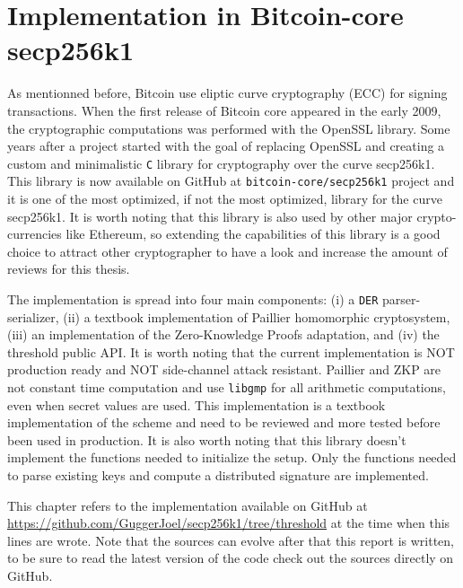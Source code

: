 \chapter{Implementation in Bitcoin-core secp256k1}
\label{chap:implementation-secp256k1}

As mentionned before, Bitcoin use eliptic curve cryptography (ECC) for signing transactions.
When the first release of Bitcoin core appeared in the early 2009, the cryptographic
computations was performed with the OpenSSL library. Some years after a project
started with the goal of replacing OpenSSL and creating a custom and minimalistic
\texttt{C} library for cryptography over the curve secp256k1. This library is now available
on GitHub at \texttt{bitcoin-core/secp256k1} project and it is one of the most optimized,
if not the most optimized, library for the curve secp256k1. It is worth noting that
this library is also used by other major crypto-currencies like Ethereum, so extending
the capabilities of this library is a good choice to attract other cryptographer
to have a look and increase the amount of reviews for this thesis.

The implementation is spread into four main components: (i) a \texttt{DER} parser-serializer,
(ii) a textbook implementation of Paillier homomorphic cryptosystem, (iii) an
implementation of the Zero-Knowledge Proofs adaptation, and (iv) the threshold
public API. It is worth noting that the current implementation is NOT production
ready and NOT side-channel attack resistant. Paillier and ZKP are not constant
time computation and use \texttt{libgmp} for all arithmetic computations, even
when secret values are used. This implementation is a textbook implementation
of the scheme and need to be reviewed and more tested before been used in production.
It is also worth noting that this library doesn't implement the functions needed
to initialize the setup. Only the functions needed to parse existing keys and compute a
distributed signature are implemented.

This chapter refers to the implementation available on GitHub at
\url{https://github.com/GuggerJoel/secp256k1/tree/threshold} at the time when
this lines are wrote. Note that the sources can evolve after that this report is written,
to be sure to read the latest version of the code check out the sources directly on GitHub.

\minitoc

\newpage

